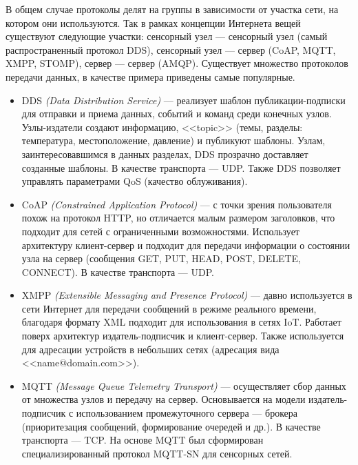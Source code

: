 \documentclass[a4paper,14pt]{extarticle}
\begin{document}
В общем случае протоколы делят на группы в зависимости от участка сети, на котором они используются. Так в рамках концепции Интернета вещей существуют следующие участки: сенсорный узел --- сенсорный узел (самый распространенный протокол DDS), сенсорный узел --- сервер (CoAP, MQTT, XMPP, STOMP), сервер --- сервер (AMQP). Существует множество протоколов передачи данных, в качестве примера приведены самые популярные.
\begin{itemize}
	\item DDS \textit{(Data Distribution Service)} --- реализует шаблон публикации-подписки для отправки и приема данных, событий и команд среди конечных узлов. Узлы-издатели создают информацию, <<topic>> (темы, разделы: температура, местоположение, давление) и публикуют шаблоны. Узлам, заинтересовавшимся в данных разделах, DDS прозрачно доставляет созданные шаблоны. В качестве транспорта --- UDP. Также DDS позволяет управлять параметрами QoS (качество облуживания).
	
	\item CoAP \textit{(Constrained Application Protocol)} --- с точки зрения пользователя похож на протокол HTTP, но отличается малым размером заголовков, что подходит для сетей с ограниченными возможностями. Использует архитектуру клиент-сервер и подходит для передачи информации о состоянии узла на сервер (сообщения GET, PUT, HEAD, POST, DELETE, CONNECT). В качестве транспорта --- UDP.
	
	\item XMPP \textit{(Extensible Messaging and Presence Protocol)} --- давно используется в сети Интернет для передачи сообщений в режиме реального времени, благодаря формату XML подходит для использования в сетях IoT. Работает поверх архитектур издатель-подписчик и клиент-сервер. Также используется для адресации устройств в небольших сетях (адресация вида <<name@domain.com>>).
	
	\item MQTT \textit{(Message Queue Telemetry Transport)} --- осуществляет сбор данных от множества узлов и передачу на сервер. Основывается на модели издатель-подписчик с использованием промежуточного сервера --- брокера (приоритезация сообщений, формирование очередей и др.). В качестве транспорта --- TCP. На основе MQTT был сформирован специализированный протокол MQTT-SN для сенсорных сетей.
\end{itemize}
\end{document}
